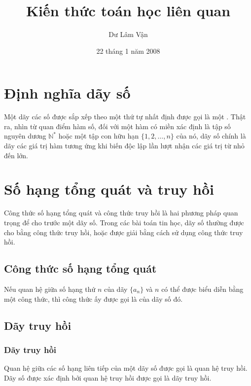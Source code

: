 \documentclass[11pt]{article}
\title{Kiến thức toán học liên quan}
\author{Dư Lâm Vận}
\date{22 tháng 1 năm 2008}
\begin{document}
\maketitle


\section{Định nghĩa dãy số}

Một dãy các số được sắp xếp theo một thứ tự nhất định được gọi là một
. Thật ra, nhìn từ quan điểm hàm số, đối với một hàm có miền xác
định là tập số nguyên dương $\mathbb{N}^{*}$ hoặc một tập con hữu hạn
$\{1,2,\ldots,n\}$ của nó, dãy số chính là dãy các giá trị hàm tương ứng khi
biến độc lập lần lượt nhận các giá trị từ nhỏ đến lớn.

\section{Số hạng tổng quát và truy hồi}

Công thức số hạng tổng quát và công thức truy hồi là hai phương pháp quan
trọng để cho trước một dãy số. Trong các bài toán tin học, dãy số thường được
cho bằng công thức truy hồi, hoặc được giải bằng cách sử dụng công thức truy
hồi.

\subsection{Công thức số hạng tổng quát}

Nếu quan hệ giữa số hạng thứ $n$ của dãy $\{a_n\}$ và $n$ có thể được biểu
diễn bằng một công thức, thì công thức ấy được gọi là  của dãy số đó.

\subsection{Dãy truy hồi}

\subsubsection{Dãy truy hồi}

Quan hệ giữa các số hạng liên tiếp của một dãy số được gọi là quan hệ truy
hồi. Dãy số được xác định bởi quan hệ truy hồi được gọi là dãy truy hồi.
\end{document}
